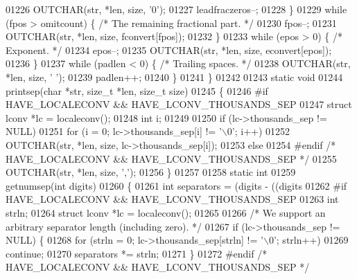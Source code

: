 \begin{DoxyCode}
{{{{{{{{{{01226         OUTCHAR(str, *len, size, \textcolor{charliteral}{'0'});
01227         leadfraczeros--;
01228     \}
01229     \textcolor{keywordflow}{while} (fpos > omitcount) \{  \textcolor{comment}{/* The remaining fractional part. */}
01230         fpos--;
01231         OUTCHAR(str, *len, size, fconvert[fpos]);
01232     \}
01233     \textcolor{keywordflow}{while} (epos > 0) \{  \textcolor{comment}{/* Exponent. */}
01234         epos--;
01235         OUTCHAR(str, *len, size, econvert[epos]);
01236     \}
01237     \textcolor{keywordflow}{while} (padlen < 0) \{    \textcolor{comment}{/* Trailing spaces. */}
01238         OUTCHAR(str, *len, size, \textcolor{charliteral}{' '});
01239         padlen++;
01240     \}
01241 \}
01242 
01243 \textcolor{keyword}{static} \textcolor{keywordtype}{void}
01244 printsep(\textcolor{keywordtype}{char} *str, \textcolor{keywordtype}{size\_t} *len, \textcolor{keywordtype}{size\_t} size)
01245 \{
01246 \textcolor{preprocessor}{#if HAVE\_LOCALECONV && HAVE\_LCONV\_THOUSANDS\_SEP}
01247     \textcolor{keyword}{struct }lconv *lc = localeconv();
01248     \textcolor{keywordtype}{int} i;
01249 
01250     \textcolor{keywordflow}{if} (lc->thousands\_sep != NULL)
01251         \textcolor{keywordflow}{for} (i = 0; lc->thousands\_sep[i] != \textcolor{charliteral}{'\(\backslash\)0'}; i++)
01252             OUTCHAR(str, *len, size, lc->thousands\_sep[i]);
01253     \textcolor{keywordflow}{else}
01254 \textcolor{preprocessor}{#endif  }\textcolor{comment}{/* HAVE\_LOCALECONV && HAVE\_LCONV\_THOUSANDS\_SEP */}\textcolor{preprocessor}{}
01255         OUTCHAR(str, *len, size, \textcolor{charliteral}{','});
01256 \}
01257 
01258 \textcolor{keyword}{static} \textcolor{keywordtype}{int}
01259 getnumsep(\textcolor{keywordtype}{int} digits)
01260 \{
01261     \textcolor{keywordtype}{int} separators = (digits - ((digits %
01262 \textcolor{preprocessor}{#if HAVE\_LOCALECONV && HAVE\_LCONV\_THOUSANDS\_SEP}
01263     \textcolor{keywordtype}{int} strln;
01264     \textcolor{keyword}{struct }lconv *lc = localeconv();
01265 
01266     \textcolor{comment}{/* We support an arbitrary separator length (including zero). */}
01267     \textcolor{keywordflow}{if} (lc->thousands\_sep != NULL) \{
01268         \textcolor{keywordflow}{for} (strln = 0; lc->thousands\_sep[strln] != \textcolor{charliteral}{'\(\backslash\)0'}; strln++)
01269             \textcolor{keywordflow}{continue};
01270         separators *= strln;
01271     \}
01272 \textcolor{preprocessor}{#endif  }\textcolor{comment}{/* HAVE\_LOCALECONV && HAVE\_LCONV\_THOUSANDS\_SEP */}\textcolor{preprocessor}{}
}}}}}}}}}}
\end{DoxyCode}
